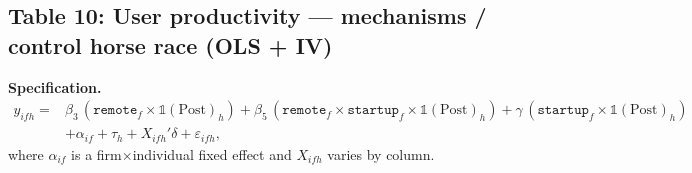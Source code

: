 \documentclass{article}
\newcommand{\cleanedresultsdir}{../../results/cleaned/tex}
\newcommand{\TableInput}[2][\linewidth]{}
\newcommand{\FloatNote}[1]{%
  \begingroup
    \captionsetup{style=noteflush}%
    \caption*{\textit{Notes:}~#1}%
  \endgroup
}
\begin{document}
\subsection*{Table 10: User productivity --- mechanisms / control horse race (OLS + IV)}
\noindent \textbf{Specification.}
\begin{equation*}
\begin{aligned}
  y_{ifh} ={}&
  \beta_3\,(\texttt{remote}_f\times \mathds{1}(\text{Post})_h)
  + \beta_5\,(\texttt{remote}_f\times \texttt{startup}_f\times \mathds{1}(\text{Post})_h)
  + \gamma\,(\texttt{startup}_f\times \mathds{1}(\text{Post})_h) \\
  &+ \alpha_{if} + \tau_h + X_{ifh}'\delta + \varepsilon_{ifh},
\end{aligned}
\end{equation*}
where $\alpha_{if}$ is a firm$\times$individual fixed effect and $X_{ifh}$ varies by column.
\begin{table}[H]\centering
  \caption{User productivity horse race (OLS + IV)}
  \TableInput{\cleanedresultsdir/llm_equity_pi_followups_horse_race.tex}
  \FloatNote{Columns correspond to alternative specifications of the baseline user productivity regression under firm$\times$individual fixed effects; checkmarks indicate which additional controls are included in each column (HHI, seniority, firm growth, and/or equity-offer controls). In columns with equity-offer controls, the added terms are $\texttt{EquityFirm}\times\mathds{1}(\text{Post})$ and $\texttt{EquityFirm}\times\mathds{1}(\text{Post})\times\text{Startup}$ (with $\texttt{EquityFirm}$ defined by the coding rule stated in Table 1). Panel A reports OLS and Panel B reports IV (instrumenting the remote interaction terms with teleworkability interaction counterparts). Rows report $\beta_3$ on $\texttt{Remote}\times\mathds{1}(\text{Post})$ (post remote effect for non-startups) and $\beta_5$ on $\texttt{Remote}\times\mathds{1}(\text{Post})\times\text{Startup}$ (incremental post remote effect for startups). The post remote effect for startups is the sum of the two rows. ``KP rk Wald F'' reports the Kleibergen--Paap rk Wald F statistic for the excluded instruments in each IV column. Standard errors are clustered by worker and reported in parentheses; *, **, *** denote $p<0.10, 0.05, 0.01$.}
\end{table}
\end{document}
